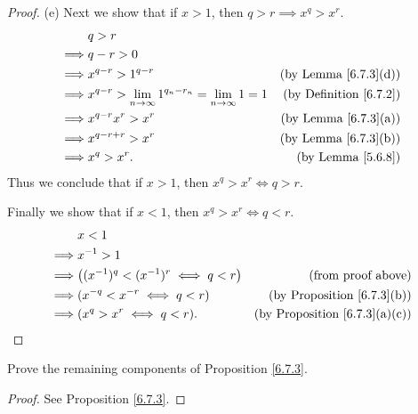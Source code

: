 \begin{proof}{(e)}
    Next we show that if \(x > 1\), then \(q > r \implies x^q > x^r\).
    \begin{align*}
                 & q > r                                                                                                          \\
        \implies & q - r > 0                                                                                                      \\
        \implies & x^{q - r} > 1^{q - r}                                                     & \text{(by Lemma \ref{6.7.3}(d))}   \\
        \implies & x^{q - r} > \lim_{n \to \infty} 1^{q_n - r_n} = \lim_{n \to \infty} 1 = 1 & \text{(by Definition \ref{6.7.2})} \\
        \implies & x^{q - r} x^r > x^r                                                       & \text{(by Lemma \ref{6.7.3}(a))}   \\
        \implies & x^{q - r + r} > x^r                                                       & \text{(by Lemma \ref{6.7.3}(b))}   \\
        \implies & x^q > x^r.                                                                & \text{(by Lemma \ref{5.6.8})}
    \end{align*}
    Thus we conclude that if \(x > 1\), then \(x^q > x^r \iff q > r\).

    Finally we show that if \(x < 1\), then \(x^q > x^r \iff q < r\).
    \begin{align*}
                 & x < 1                                                                                    \\
        \implies & x^{-1} > 1                                                                               \\
        \implies & \big((x^{-1})^q < (x^{-1})^r \iff q < r\big) & \text{(from proof above)}                 \\
        \implies & (x^{-q} < x^{-r} \iff q < r)                 & \text{(by Proposition \ref{6.7.3}(b))}    \\
        \implies & (x^q > x^r \iff q < r).                      & \text{(by Proposition \ref{6.7.3}(a)(c))}
    \end{align*}
\end{proof}

\exercisesection

\begin{exercise}\label{ex 6.7.1}
    Prove the remaining components of Proposition \ref{6.7.3}.
\end{exercise}

\begin{proof}
    See Proposition \ref{6.7.3}.
\end{proof}